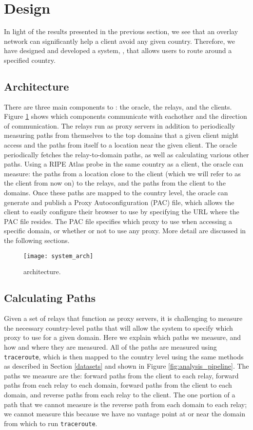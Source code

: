 \section{Design}
\label{system_design}
In light of the results presented in the previous section, we see that an 
overlay network can significantly help a client avoid any given country.  
Therefore, we have designed and developed a system, \system{}, that allows users 
to route around a specified country.

\subsection{Architecture}

There are three main components to \system{}: the oracle, the relays, and the 
clients.  Figure \ref{fig:arch} shows which components communicate with 
eachother and the direction of communication.  The relays run as 
proxy servers in addition to periodically measuring paths from themselves to the 
top domains that a given client might access and the paths from itself to a 
location near the given client.  The oracle periodically fetches the 
relay-to-domain paths, as well as calculating various other paths.  Using a RIPE
 Atlas probe in the same country as a client, the oracle can measure: the paths
 from a location close to the client (which we will refer to as the client from 
now on) to the relays, and the paths from the client to the domains.  Once these
 paths are mapped to the country level, the oracle can generate and publish a 
Proxy Autoconfiguration (PAC) file, which allows the client to easily configure 
their browser to use \system{} by specifying the URL where the PAC file resides.
  The PAC file specifies which proxy to use when accessing a specific domain, 
or whether or not to use any proxy.  More detail are discussed in the following 
sections.

\begin{figure}[t]
\centering
\texttt{[image: system\_arch]}
\caption{\system{} architecture.}
\label{fig:arch}
\end{figure}

\subsection{Calculating Paths}
Given a set of relays that function as proxy servers, it is challenging to 
measure the necessary country-level paths that will allow the system to specify 
which proxy to use for a given domain.  Here we explain which paths we measure, 
and how and where they are measured.  All of the paths are measured using {\tt 
traceroute}, which is then mapped to the country level using the same methods as 
described in Section \ref{datasets} and shown in Figure 
\ref{fig:analysis_pipeline}.  The paths we measure are the: forward paths from 
the client to each relay, forward paths from each relay to each domain, forward 
paths from the client to each domain, and reverse paths from each relay to the 
client.  The one portion of a path that we cannot measure is the reverse path 
from each domain to each relay; we cannot measure this because we have no 
vantage point at or near the domain from which to run {\tt traceroute}.

